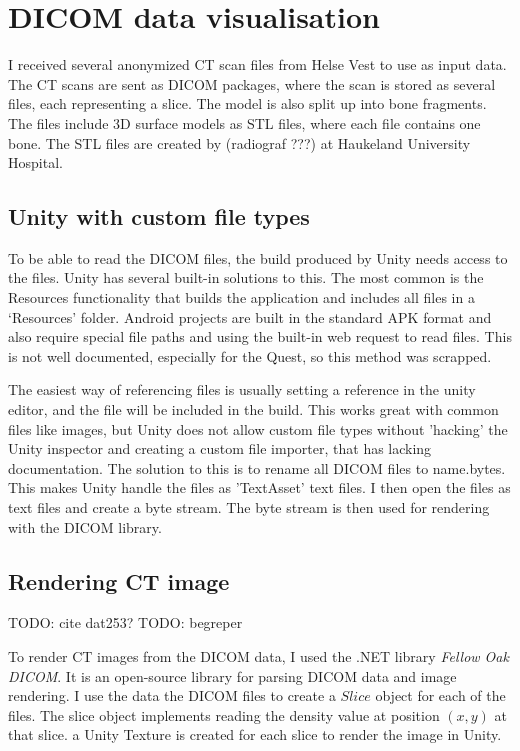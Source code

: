 \documentclass[a4paper]{report}
\begin{document}
\section{DICOM data visualisation}
I received several anonymized CT scan files from Helse Vest to use as input data. The CT scans are sent as DICOM packages\cite{noauthor_dicom_nodate}, where the scan is stored as several files, each representing a slice.
The model is also split up into bone fragments. The files include 3D surface models as STL files, where each file contains one bone. The STL files are created by (radiograf ???) at Haukeland University Hospital.


\subsection{Unity with custom file types}

To be able to read the DICOM files, the build produced by Unity needs access to the files. Unity has several built-in solutions to this.
The most common is the Resources functionality\cite{resourcesload_unity_nodate} that builds the application and includes all files in a `Resources' folder. Android projects are built in the standard APK format and also require special file paths and using the built-in web request to read files. This is not well documented, especially for the Quest, so this method was scrapped.

The easiest way of referencing files is usually setting a reference in the unity editor, and the file will be included in the build. This works great with common files like images, but Unity does not allow custom file types without 'hacking' the Unity inspector and creating a custom file importer\cite{scriptedimporters_unity_nodate}, that has lacking documentation. The solution to this is to rename all DICOM files to {name}.bytes. This makes Unity handle the files as 'TextAsset' text files\cite{textassets_unity_nodate}. I then open the files as text files and create a byte stream. The byte stream is then used for rendering with the DICOM library.

\subsection{Rendering CT image}
TODO: cite dat253?
TODO: begreper

To render CT images from the DICOM data, I used the .NET library \emph{Fellow Oak DICOM}\cite{noauthor_fellow_2022}. It is an open-source library for parsing DICOM data and image rendering.
I use the data the DICOM files to create a $Slice$ object for each of the files. The slice object implements reading the density value at position $(x, y)$ at that slice. a Unity Texture is created for each slice to render the image in Unity.
\end{document}
